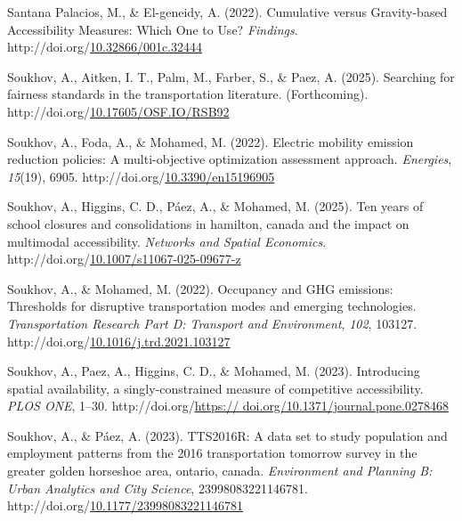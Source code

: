 \documentclass[
11pt, %
oneside, %
english, %
singlespacing, %
]{macthesis} %
\newlength{\cslhangindent}
\newenvironment{CSLReferences}[2] %
{\begin{list}{}{%
	\setlength{\itemindent}{0pt}
	\setlength{\leftmargin}{0pt}
	\setlength{\parsep}{0pt}
	\ifodd #1
	\setlength{\leftmargin}{\cslhangindent}
	\setlength{\itemindent}{-1\cslhangindent}
	\fi
	\setlength{\itemsep}{#2\baselineskip}}}
{\end{list}}
\begin{document}
\begin{CSLReferences}{1}{0}
Santana Palacios, M., \& El-geneidy, A. (2022). Cumulative versus Gravity-based Accessibility Measures: Which One to Use? \emph{Findings}. http://doi.org/\href{https://doi.org/10.32866/001c.32444}{10.32866/001c.32444}

Soukhov, A., Aitken, I. T., Palm, M., Farber, S., \& Paez, A. (2025). Searching for fairness standards in the transportation literature. (Forthcoming). http://doi.org/\href{https://doi.org/10.17605/OSF.IO/RSB92}{10.17605/OSF.IO/RSB92}

Soukhov, A., Foda, A., \& Mohamed, M. (2022). Electric mobility emission reduction policies: A multi-objective optimization assessment approach. \emph{Energies}, \emph{15}(19), 6905. http://doi.org/\href{https://doi.org/10.3390/en15196905}{10.3390/en15196905}

Soukhov, A., Higgins, C. D., Páez, A., \& Mohamed, M. (2025). Ten years of school closures and consolidations in hamilton, canada and the impact on multimodal accessibility. \emph{Networks and Spatial Economics}. http://doi.org/\href{https://doi.org/10.1007/s11067-025-09677-z}{10.1007/s11067-025-09677-z}

Soukhov, A., \& Mohamed, M. (2022). Occupancy and {GHG} emissions: Thresholds for disruptive transportation modes and emerging technologies. \emph{Transportation Research Part D: Transport and Environment}, \emph{102}, 103127. http://doi.org/\href{https://doi.org/10.1016/j.trd.2021.103127}{10.1016/j.trd.2021.103127}

Soukhov, A., Paez, A., Higgins, C. D., \& Mohamed, M. (2023). Introducing spatial availability, a singly-constrained measure of competitive accessibility. \emph{{PLOS} {ONE}}, 1--30. http://doi.org/\href{https://\%20doi.org/10.1371/journal.pone.0278468}{https:// doi.org/10.1371/journal.pone.0278468}

Soukhov, A., \& Páez, A. (2023). {TTS}2016R: A data set to study population and employment patterns from the 2016 transportation tomorrow survey in the greater golden horseshoe area, ontario, canada. \emph{Environment and Planning B: Urban Analytics and City Science}, 23998083221146781. http://doi.org/\href{https://doi.org/10.1177/23998083221146781}{10.1177/23998083221146781}


\end{CSLReferences}
\end{document}
